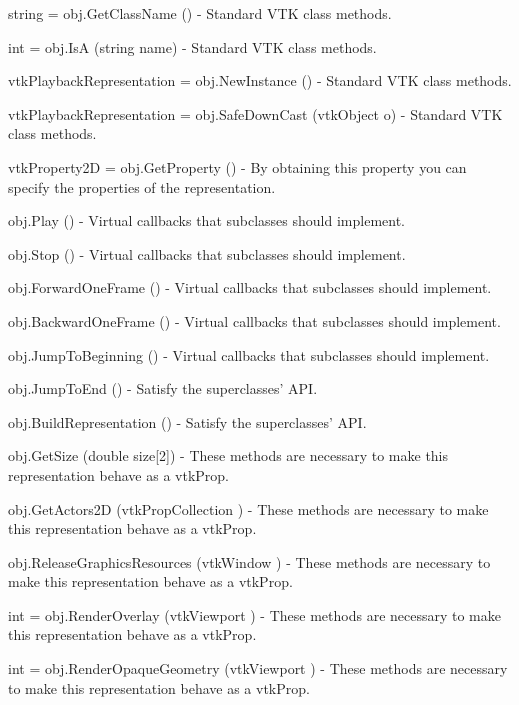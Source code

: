 \begin{DoxyItemize}
\item {\ttfamily string = obj.\-Get\-Class\-Name ()} -\/ Standard V\-T\-K class methods.  
\item {\ttfamily int = obj.\-Is\-A (string name)} -\/ Standard V\-T\-K class methods.  
\item {\ttfamily vtk\-Playback\-Representation = obj.\-New\-Instance ()} -\/ Standard V\-T\-K class methods.  
\item {\ttfamily vtk\-Playback\-Representation = obj.\-Safe\-Down\-Cast (vtk\-Object o)} -\/ Standard V\-T\-K class methods.  
\item {\ttfamily vtk\-Property2\-D = obj.\-Get\-Property ()} -\/ By obtaining this property you can specify the properties of the representation.  
\item {\ttfamily obj.\-Play ()} -\/ Virtual callbacks that subclasses should implement.  
\item {\ttfamily obj.\-Stop ()} -\/ Virtual callbacks that subclasses should implement.  
\item {\ttfamily obj.\-Forward\-One\-Frame ()} -\/ Virtual callbacks that subclasses should implement.  
\item {\ttfamily obj.\-Backward\-One\-Frame ()} -\/ Virtual callbacks that subclasses should implement.  
\item {\ttfamily obj.\-Jump\-To\-Beginning ()} -\/ Virtual callbacks that subclasses should implement.  
\item {\ttfamily obj.\-Jump\-To\-End ()} -\/ Satisfy the superclasses' A\-P\-I.  
\item {\ttfamily obj.\-Build\-Representation ()} -\/ Satisfy the superclasses' A\-P\-I.  
\item {\ttfamily obj.\-Get\-Size (double size\mbox{[}2\mbox{]})} -\/ These methods are necessary to make this representation behave as a vtk\-Prop.  
\item {\ttfamily obj.\-Get\-Actors2\-D (vtk\-Prop\-Collection )} -\/ These methods are necessary to make this representation behave as a vtk\-Prop.  
\item {\ttfamily obj.\-Release\-Graphics\-Resources (vtk\-Window )} -\/ These methods are necessary to make this representation behave as a vtk\-Prop.  
\item {\ttfamily int = obj.\-Render\-Overlay (vtk\-Viewport )} -\/ These methods are necessary to make this representation behave as a vtk\-Prop.  
\item {\ttfamily int = obj.\-Render\-Opaque\-Geometry (vtk\-Viewport )} -\/ These methods are necessary to make this representation behave as a vtk\-Prop.  

\end{DoxyItemize}
